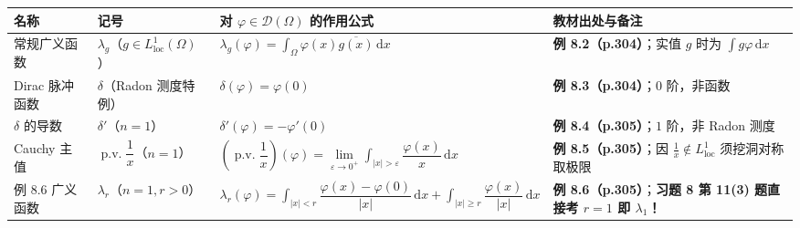 \documentclass[11pt,a4paper]{article}
\newcounter{none}
\begin{document}
{\def\LTcaptype{none} %
{\small\renewcommand{\arraystretch}{1.38}\setlength{\tabcolsep}{5pt}
\begin{longtable}[]{@{}
  >{\raggedright\arraybackslash}p{}
  >{\raggedright\arraybackslash}p{}
  >{\raggedright\arraybackslash}p{}
  >{\raggedright\arraybackslash}p{}@{}}
\toprule\noalign{}
\rowcolor{AccentSoft}
\begin{minipage}[b]{\linewidth}\raggedright
名称
\end{minipage} & \begin{minipage}[b]{\linewidth}\raggedright
记号
\end{minipage} & \begin{minipage}[b]{\linewidth}\raggedright
对 \(\varphi \in \mathcal{D}(\Omega)\) 的作用公式
\end{minipage} & \begin{minipage}[b]{\linewidth}\raggedright
教材出处与备注
\end{minipage} \\
\midrule\noalign{}
\endhead
\bottomrule\noalign{}
\endlastfoot
常规广义函数 & \(\lambda_g\)（\(g \in L^1_{\mathrm{loc}}(\Omega)\)） & \(\lambda_g(\varphi) = \int_{\Omega} \varphi(x)\overline{g(x)}\,\mathrm{d}x\) & \textbf{例 8.2（p.304）}；实值 \(g\) 时为 \(\int g\varphi\,\mathrm{d}x\) \\
Dirac 脉冲函数 & \(\delta\)（Radon 测度特例） & \(\delta(\varphi) = \varphi(0)\) & \textbf{例 8.3（p.304）}；\(0\) 阶，非函数 \\
\(\delta\) 的导数 & \(\delta'\)（\(n=1\)） & \(\delta'(\varphi) = -\varphi'(0)\) & \textbf{例 8.4（p.305）}；\(1\) 阶，非 Radon 测度 \\
Cauchy 主值 & \(\operatorname{p.v.}\dfrac{1}{x}\)（\(n=1\)） & \(\left(\operatorname{p.v.}\dfrac{1}{x}\right)(\varphi) = \lim\limits_{\varepsilon\to 0^+}\displaystyle\int_{\lvert x\rvert>\varepsilon}\dfrac{\varphi(x)}{x}\,\mathrm{d}x\) & \textbf{例 8.5（p.305）}；因 \(\frac{1}{x} \notin L^1_{\mathrm{loc}}\) 须挖洞对称取极限 \\
例 8.6 广义函数 & \(\lambda_r\)（\(n=1, r>0\)） & \(\lambda_r(\varphi) = \displaystyle\int_{\lvert x\rvert<r}\dfrac{\varphi(x)-\varphi(0)}{\lvert x\rvert}\,\mathrm{d}x + \displaystyle\int_{\lvert x\rvert\ge r}\dfrac{\varphi(x)}{\lvert x\rvert}\,\mathrm{d}x\) & \textbf{例 8.6（p.305）}；\textbf{习题 8 第 11(3) 题直接考 \(r=1\) 即 \(\lambda_1\)！} \\
\end{longtable}
}
}
\end{document}
